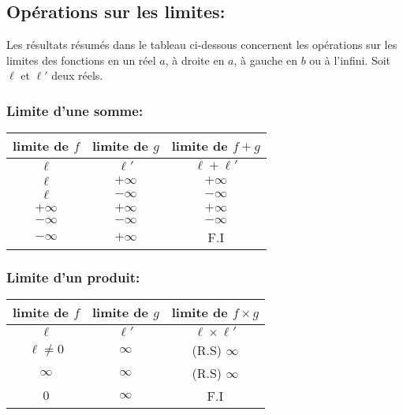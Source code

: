 \documentclass[12pt,a4paper,x11names,usenames,dvipsnames,svgnames,oneside]{book}
\begin{document}
\subsection{Opérations sur les limites:}
Les résultats résumés dans le tableau ci-dessous concernent les opérations sur les limites des fonctions en un réel $a$, à droite en $a$, à gauche en $b$ ou à l'infini. Soit $\ell$ et $\ell '$ deux réels.
\subsubsection{Limite d'une somme:}
\begin{center}

\begin{tabular}{|c|c|c|}
\hline
limite de $f$ & limite de $g$ & limite de $f+g$\\
\hline 
$\ell$ & $\ell '$ & $\ell+\ell'$\\
\hline
$\ell$ & $+\infty$ & $+\infty$\\
\hline
$\ell$ & $-\infty$ & $-\infty$\\
\hline
$+\infty$ & $+\infty$ & $+\infty$\\
\hline
$-\infty$ & $-\infty$ & $-\infty$\\
\hline
$-\infty$ & $+\infty$ & F.I\\
\hline
\end{tabular}
\end{center}
\subsubsection{Limite d'un produit:}
\begin{center}
\begin{tabular}{|c|c|c|}
\hline
limite de $f$ & limite de $g$ & limite de $f\times g$\\
\hline 
$\ell$ & $\ell '$ & $\ell \times \ell'$\\
\hline
$\ell\neq 0$ & $\infty$ & (R.S) $\infty$\\
\hline
$\infty$ & $\infty$ &(R.S) $\infty$\\
\hline
$0$ & $\infty$ & F.I\\
\hline
\end{tabular}
\end{center}
\end{document}
